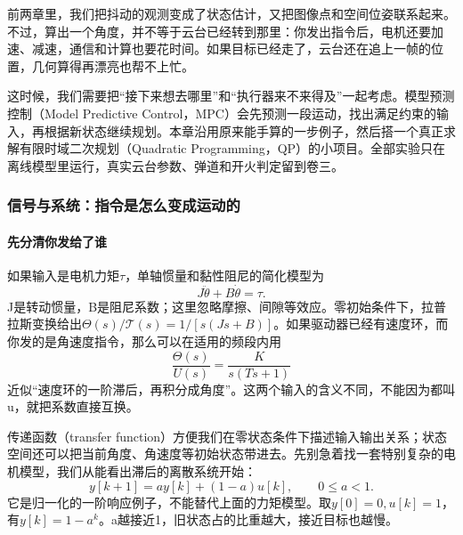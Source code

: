 前两章里，我们把抖动的观测变成了状态估计，又把图像点和空间位姿联系起来。不过，算出一个角度，并不等于云台已经转到那里：你发出指令后，电机还要加速、减速，通信和计算也要花时间。如果目标已经走了，云台还在追上一帧的位置，几何算得再漂亮也帮不上忙。

这时候，我们需要把“接下来想去哪里”和“执行器来不来得及”一起考虑。模型预测控制（Model Predictive Control，MPC）会先预测一段运动，找出满足约束的输入，再根据新状态继续规划。本章沿用原来能手算的一步例子，然后搭一个真正求解有限时域二次规划（Quadratic Programming，QP）的小项目。全部实验只在离线模型里运行，真实云台参数、弹道和开火判定留到卷三。

\subsubsection{信号与系统：指令是怎么变成运动的}

\paragraph*{先分清你发给了谁}
如果输入是电机力矩$\tau$，单轴惯量和黏性阻尼的简化模型为
\[
J\ddot\theta+B\dot\theta=\tau.
\]
J是转动惯量，B是阻尼系数；这里忽略摩擦、间隙等效应。零初始条件下，拉普拉斯变换给出$\Theta(s)/\mathcal{T}(s)=1/[s(Js+B)]$。如果驱动器已经有速度环，而你发的是角速度指令，那么可以在适用的频段内用
\[
\frac{\Theta(s)}{U(s)}=\frac{K}{s(Ts+1)}
\]
近似“速度环的一阶滞后，再积分成角度”。这两个输入的含义不同，不能因为都叫u，就把系数直接互换。

传递函数（transfer function）方便我们在零状态条件下描述输入输出关系；状态空间还可以把当前角度、角速度等初始状态带进去。先别急着找一套特别复杂的电机模型，我们从能看出滞后的离散系统开始：
\[
y[k+1]=a y[k]+(1-a)u[k],\qquad 0\le a<1.
\]
它是归一化的一阶响应例子，不能替代上面的力矩模型。取$y[0]=0,u[k]=1$，有$y[k]=1-a^k$。a越接近1，旧状态占的比重越大，接近目标也越慢。

